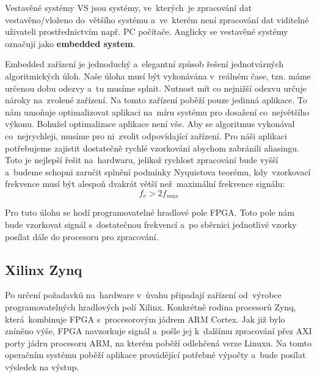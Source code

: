 			\begin{definice}
				Vestavěné systémy VS jsou systémy, ve~kterých~je zpracování dat vestavěno/vloženo do~většího systému a~ve~kterém není zpracování dat viditelné uživateli prostřednictvím např. PC počítače. Anglicky se vestavěné systémy označují jako \textbf{embedded system}\cite{impSkripta}.
			\end{definice}
			
			Embedded zařízení je jednoduchý a~elegantní způsob řešení jednotvárných algoritmických úloh. Naše úloha musí být vykonávána v~reálném čase, tzn. máme určenou dobu odezvy a~tu musíme splnit. Nutnost mít co nejnižší odezvu určuje nároky na~zvolené zařízení. Na tomto zařízení poběží pouze jedinná aplikace. To nám umoňuje optimalizovat aplikaci na~míru systému pro dosažení co~největšího výkonu.
			Bohužel optimalizace aplikace není vše. Aby se algoritmus vykonával co~nejrychleji, musíme pro ni~zvolit odpovídající zařízení. Pro náši aplikaci potřebujeme zajistit dostatečně rychlé vzorkování abychom zabránili aliasingu. Toto je nejlepší řešit na~hardwaru, jelikož rychlost zpracování bude vyšší a~budeme schopni zaručit splnění podmínky Nyquistova teorému, kdy~vzorkovací frekvence musí být alespoň dvakrát větší než~maximální frekvence signálu: \[f_v > 2f_{max}\]
			
			Pro tuto úlohu se hodí programovatelné hradlové pole FPGA. Toto pole nám bude vzorkovat signál s~dostatečnou frekvencí a~po sběrnici jednotlivé vzorky posílat dále do procesoru pro zpracování.\par
			
			\subsection{Xilinx Zynq}
				Po určení požadavků na~hardware v~ůvahu připadají zařízení od~výrobce programovatelných hradlových polí Xilinx. Konkrétně rodina procesorů Zynq, která~kombinuje FPGA s~procesorovým jádrem ARM Cortex.
				Jak již bylo zníněno výše, FPGA navzorkuje signál a~pošle jej k~dalšímu zpracování přez AXI porty jádru procesoru ARM, na kterém poběží odlehčená verze Linuxu. Na tomto operačním systému poběží aplikace provádějící potřebné výpočty a~bude posílat výsledek na výstup.
				
